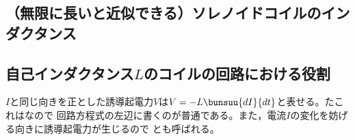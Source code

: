   \subsection{（無限に長いと近似できる）ソレノイドコイルのインダクタンス}


  \subsection{自己インダクタンス$L$のコイルの回路における役割}

  $I$と同じ向きを正とした誘導起電力$V$は$V=-L\bunsuu{dI}{dt}$と表せる。たこれはなので
  回路方程式の左辺に書くのが普通である。また，電流$I$の変化を妨げる向きに誘導起電力が生じるので
  とも呼ばれる。

